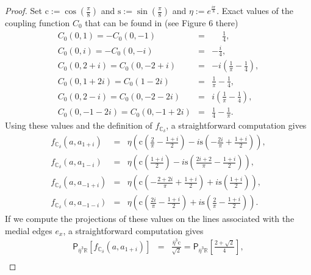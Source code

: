 \documentclass[oneside,english]{amsart}
\numberwithin{equation}{section}
\numberwithin{figure}{section}
\theoremstyle{plain}
\theoremstyle{plain}
\theoremstyle{plain}
\theoremstyle{plain}
\theoremstyle{plain}
\theoremstyle{definition}
\theoremstyle{remark}
\begin{document}
\begin{proof}
Set $\mathrm{c}:=\cos\left(\frac{\pi}{8}\right)$ and $\mathrm{s}:=\sin\left(\frac{\pi}{8}\right)$
and $\eta:=e^{\frac{i\pi}{8}}$. Exact values of the coupling function
$C_{0}$ that can be found in \cite{kenyon-i} (see Figure 6 there)
\begin{eqnarray*}
C_{0}\left(0,1\right)=-C_{0}\left(0,-1\right) & = & \phantom{-}\frac{1}{4},\\
C_{0}\left(0,i\right)=-C_{0}\left(0,-i\right) & = & -\frac{i}{4},\\
C_{0}\left(0,2+i\right)=C_{0}\left(0,-2+i\right) & = & -i\left(\frac{1}{\pi}-\frac{1}{4}\right),\\
C_{0}\left(0,1+2i\right)=C_{0}\left(1-2i\right) & = & \frac{1}{\pi}-\frac{1}{4},\\
C_{0}\left(0,2-i\right)=C_{0}\left(0,-2-2i\right) & = & i\left(\frac{1}{\pi}-\frac{1}{4}\right),\\
C_{0}\left(0,-1-2i\right)=C_{0}\left(0,-1+2i\right) & = & \frac{1}{4}-\frac{1}{\pi}.
\end{eqnarray*}
Using these values and the definition of $f_{\mathbb{C}_{\delta}}$,
a straightforward computation gives
\begin{eqnarray*}
f_{\mathbb{C}_{\delta}}\left(a,a_{1+i}\right) & = & \eta\left(\mathrm{c}\left(\frac{2}{\pi}-\frac{1+i}{2}\right)-i\mathrm{s}\left(-\frac{2i}{\pi}+\frac{1+i}{2}\right)\right),\\
f_{\mathbb{C}_{\delta}}\left(a,a_{1-i}\right) & = & \eta\left(\mathrm{c}\left(\frac{1+i}{2}\right)-i\mathrm{s}\left(\frac{2i+2}{\pi}-\frac{1+i}{2}\right)\right),\\
f_{\mathbb{C}_{\delta}}\left(a,a_{-1+i}\right) & = & \eta\left(\mathrm{c}\left(-\frac{2+2i}{\pi}+\frac{1+i}{2}\right)+i\mathrm{s}\left(\frac{1+i}{2}\right)\right),\\
f_{\mathbb{C}_{\delta}}\left(a,a_{-1-i}\right) & = & \eta\left(\mathrm{c}\left(\frac{2i}{\pi}-\frac{1+i}{2}\right)+i\mathrm{s}\left(\frac{2}{\pi}-\frac{1+i}{2}\right)\right).
\end{eqnarray*}
If we compute the projections of these values on the lines associated
with the medial edges $e_{x}$, a straightforward computation gives
\begin{eqnarray*}
\mathsf{P}_{\overline{\eta}^{3}\mathbb{R}}\left[f_{\mathbb{C}_{\delta}}\left(a,a_{1+i}\right)\right] & = & \frac{\overline{\eta}^{3}\mathrm{c}}{\sqrt{2}}=\mathsf{P}_{\overline{\eta}^{3}\mathbb{R}}\left[\frac{2+\sqrt{2}}{4}\right],\\

\end{eqnarray*}
\end{proof}
\end{document}
